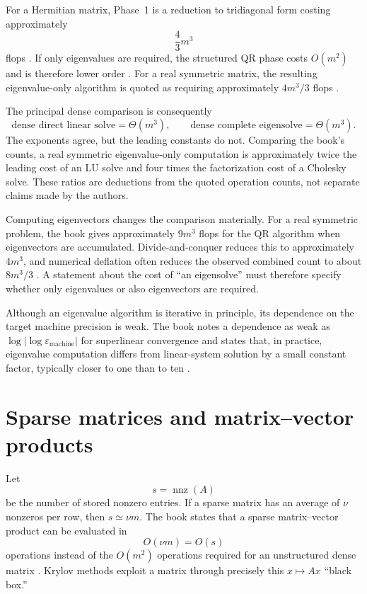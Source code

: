 \documentclass[11pt,a4paper]{article}
\newcommand{\nnz}{\operatorname{nnz}}
\newcommand{\epsm}{\varepsilon_{\mathrm{machine}}}
\begin{document}
For a Hermitian matrix, Phase~1 is a reduction to tridiagonal form costing
approximately
\begin{equation}
  \frac{4}{3}m^3
\end{equation}
flops \cite[p.~200, (26.2)]{trefethenbau}.  If only eigenvalues are required,
the structured QR phase costs $O(m^2)$ and is therefore lower order
\cite[p.~194]{trefethenbau}.  For a real symmetric matrix, the resulting
eigenvalue-only algorithm is quoted as requiring approximately $4m^3/3$ flops
\cite[p.~223]{trefethenbau}.

The principal dense comparison is consequently
\begin{equation}
  \boxed{\text{dense direct linear solve}=\Theta(m^3),\qquad
         \text{dense complete eigensolve}=\Theta(m^3).}
\end{equation}
The exponents agree, but the leading constants do not.  Comparing the book's
counts, a real symmetric eigenvalue-only computation is approximately twice
the leading cost of an LU solve and four times the factorization cost of a
Cholesky solve.  These ratios are deductions from the quoted operation counts,
not separate claims made by the authors.

Computing eigenvectors changes the comparison materially.  For a real
symmetric problem, the book gives approximately $9m^3$ flops for the QR
algorithm when eigenvectors are accumulated.  Divide-and-conquer reduces this
to approximately $4m^3$, and numerical deflation often reduces the observed
combined count to about $8m^3/3$ \cite[p.~232]{trefethenbau}.  A statement about
the cost of ``an eigensolve'' must therefore specify whether only eigenvalues or
also eigenvectors are required.

Although an eigenvalue algorithm is iterative in principle, its dependence on
the target machine precision is weak.  The book notes a dependence as weak as
$\log\lvert\log\epsm\rvert$ for superlinear convergence and states that, in
practice, eigenvalue computation differs from linear-system solution by a
small constant factor, typically closer to one than to ten
\cite[p.~193 and Exercise~25.2]{trefethenbau}.

\section{Sparse matrices and matrix--vector products}

Let
\begin{equation}
  s=\nnz(A)
\end{equation}
be the number of stored nonzero entries.  If a sparse matrix has an average of
$\nu$ nonzeros per row, then $s\simeq \nu m$.  The book states that a sparse
matrix--vector product can be evaluated in
\begin{equation}
  O(\nu m)=O(s)
\end{equation}
operations instead of the $O(m^2)$ operations required for an unstructured
dense matrix \cite[pp.~244--245]{trefethenbau}.  Krylov methods exploit a matrix
through precisely this $x\mapsto Ax$ ``black box.''
\end{document}
